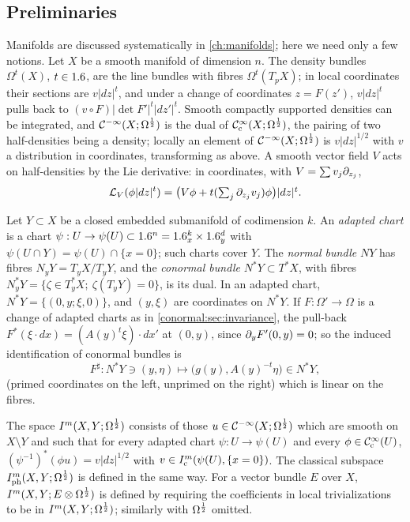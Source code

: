 \subsection{Preliminaries}
Manifolds are discussed systematically in \cref{ch:manifolds}; here we need
only a few notions.  Let $X$ be a smooth manifold of dimension $n$.  The
density bundles $\Omega^t(X)$, $t\in1.6$, are the line bundles with fibres
$\Omega^t(T_pX)$; in local coordinates their sections are $v|dz|^t$, and under a
change of coordinates $z=F(z')$, $v|dz|^t$ pulls back to $(v\circ
F)|\det F'|^t|dz'|^t$.  Smooth compactly supported densities can be integrated,
and $\mathcal{C}^{-\infty}(X;\Omega^{\frac12})$ is the dual of $\mathcal{C}^\infty_{\mathrm{c}}(X;\Omega^{\frac12})$, the pairing of two
half-densities being a density; locally an element of $\mathcal{C}^{-\infty}(X;\Omega^{\frac12})$ is
$v|dz|^{1/2}$ with $v$ a distribution in coordinates, transforming as above.
A smooth vector field $V$ acts on half-densities by the Lie derivative: in
coordinates, with $V=\sum v_j\partial_{z_j}$,
\begin{equation}\label{conormal:eq:Lie}
  \mathcal L_V(\phi|dz|^{t})=\big(V\phi+t(\textstyle\sum_j\partial_{z_j}v_j)\phi\big)|dz|^{t}.
\end{equation}

Let $Y\subset X$ be a closed embedded submanifold of codimension $k$.  An
\emph{adapted chart} is a chart $\psi:U\to\psi(U)\subset1.6^n=1.6^k_x\times1.6^d_y$
with $\psi(U\cap Y)=\psi(U)\cap\{x=0\}$; such charts cover $Y$.  The
\emph{normal bundle} $NY$ has fibres $N_yY=T_yX/T_yY$, and the \emph{conormal
bundle} $N^*Y\subset T^*X$, with fibres $N_y^*Y=\{\zeta\in T^*_yX;\
\zeta(T_yY)=0\}$, is its dual.  In an adapted chart,
$N^*Y=\{(0,y;\xi,0)\}$, and $(y,\xi)$ are coordinates on $N^*Y$.  If
$F:\Omega'\to\Omega$ is a change of adapted charts as in
\cref{conormal:sec:invariance}, the pull-back
$F^*(\xi\cdot dx)=(A(y)^t\xi)\cdot dx'$ at $(0,y)$, since $\partial_yF'(0,y)=0$; so
the induced identification of conormal bundles is
\begin{equation}\label{conormal:eq:Fsharp}
  F^\sharp:N^*Y\ni(y,\eta)\longmapsto\big(g(y),A(y)^{-t}\eta\big)\in N^*Y,
\end{equation}
(primed coordinates on the left, unprimed on the right) which is linear on the
fibres.

\begin{definition}\label{conormal:def:manifold}
  The space $I^{m}(X,Y;\Omega^{\frac12})$ consists of those $u\in\mathcal{C}^{-\infty}(X;\Omega^{\frac12})$ which
  are smooth on $X\setminus Y$ and such that for every adapted chart
  $\psi:U\to\psi(U)$ and every $\phi\in\mathcal{C}^\infty_{\mathrm{c}}(U)$,
  $(\psi^{-1})^*(\phi u)=v|dz|^{1/2}$ with $v\in I^{m}_{\mathrm c}(\psi(U),\{x=0\})$.
  The classical subspace $I^{m}_{\mathrm{ph}}(X,Y;\Omega^{\frac12})$ is defined in the
  same way.  For a vector bundle $E$ over $X$, $I^{m}(X,Y;E\otimes\Omega^{\frac12})$ is
  defined by requiring the coefficients in local trivializations to be in
  $I^{m}(X,Y;\Omega^{\frac12})$; similarly with $\Omega^{\frac12}$ omitted.
\end{definition}

